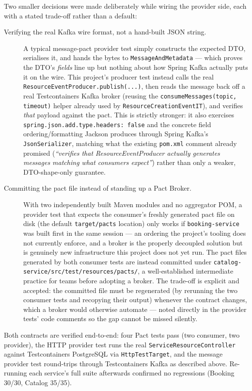 Two smaller decisions were made deliberately while wiring the provider side, each with a stated trade-off rather than a default:

\begin{description}
    \item[Verifying the real Kafka wire format, not a hand-built JSON string.] A typical message-pact provider test simply constructs the expected DTO, serialises it, and hands the bytes to \texttt{MessageAndMetadata} --- which proves the DTO's \emph{fields} line up but nothing about how Spring Kafka actually puts it on the wire. This project's producer test instead calls the real \texttt{ResourceEventProducer.publish(...)}, then reads the message back off a real Testcontainers Kafka broker (reusing the \texttt{consumeMessages(topic, timeout)} helper already used by \texttt{ResourceCreationEventIT}), and verifies \emph{that} payload against the pact. This is strictly stronger: it also exercises \texttt{spring.json.add.type.headers: false} and the concrete field ordering/formatting Jackson produces through Spring Kafka's \texttt{JsonSerializer}, matching what the existing \texttt{pom.xml} comment already promised (\emph{``verifies that ResourceEventProducer actually generates messages matching what consumers expect''}) rather than only a weaker, DTO-shape-only guarantee.
    \item[Committing the pact file instead of standing up a Pact Broker.] With two independently built Maven modules and no aggregator POM, a provider test that expects the consumer's freshly generated pact file on disk (the default \texttt{target/pacts} location) only works if \texttt{booking-service} was built first in the same session --- an ordering the project's tooling does not currently enforce, and a broker is the properly decoupled solution but is genuinely new infrastructure this project does not yet run. The pact files generated by both consumer tests are instead committed under \texttt{catalog-service/src/test/resources/pacts/}, a well-established intermediate practice for teams before adopting a broker. The trade-off is explicit and accepted: the committed file must be regenerated (by rerunning the two consumer tests and recopying their output) whenever the contract changes, which a broker would otherwise automate --- noted directly in the provider tests' code comments so the gap cannot be missed silently.
\end{description}

Both contracts are verified end-to-end: four Pact tests pass (two consumer, two provider), the HTTP provider test runs the real \texttt{ServiceResourceController} against Testcontainers PostgreSQL via \texttt{HttpTestTarget}, and the message provider test round-trips through Testcontainers Kafka as described above. Re-running each service's full suite afterwards confirmed no regressions (Booking 30/30, Catalog 35/35).

